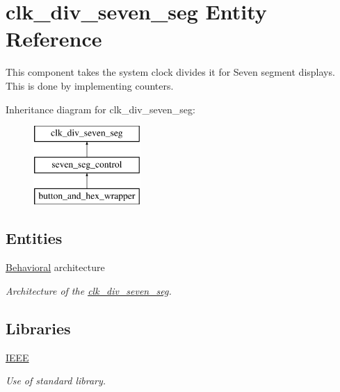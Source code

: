 \hypertarget{classclk__div__seven__seg}{\section{clk\-\_\-div\-\_\-seven\-\_\-seg Entity Reference}
\label{classclk__div__seven__seg}
}


This component takes the system clock divides it for Seven segment displays. This is done by implementing counters.  


Inheritance diagram for clk\-\_\-div\-\_\-seven\-\_\-seg\-:\begin{figure}[H]
\begin{center}
\leavevmode
\includegraphics[height=3.000000cm]{classclk__div__seven__seg}
\end{center}
\end{figure}
\subsection*{Entities}
\begin{DoxyCompactItemize}
\item 
\hyperlink{classclk__div__seven__seg_1_1Behavioral}{Behavioral} architecture
\begin{DoxyCompactList}\small\item\em Architecture of the \hyperlink{classclk__div__seven__seg}{clk\-\_\-div\-\_\-seven\-\_\-seg}. \end{DoxyCompactList}\end{DoxyCompactItemize}
\subsection*{Libraries}
 \begin{DoxyCompactItemize}
\item 
\hypertarget{classclk__div__seven__seg_ae4f03c286607f3181e16b9aa12d0c6d4}{\hyperlink{classclk__div__seven__seg_ae4f03c286607f3181e16b9aa12d0c6d4}{I\-E\-E\-E} }\label{classclk__div__seven__seg_ae4f03c286607f3181e16b9aa12d0c6d4}

\begin{DoxyCompactList}\small\item\em Use of standard library. \end{DoxyCompactList}\end{DoxyCompactItemize}
